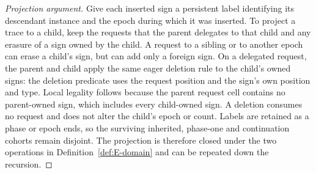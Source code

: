 \documentclass[11pt,letterpaper]{article}
\theoremstyle{definition}
\theoremstyle{remark}
\begin{document}
\begin{proof}[Projection argument]
Give each inserted sign a persistent label identifying its descendant instance and the epoch during which it was inserted. To project a trace to a child, keep the requests that the parent delegates to that child and any erasure of a sign owned by the child. A request to a sibling or to another epoch can erase a child's sign, but can add only a foreign sign. On a delegated request, the parent and child apply the same eager deletion rule to the child's owned signs: the deletion predicate uses the request position and the sign's own position and type. Local legality follows because the parent request cell contains no parent-owned sign, which includes every child-owned sign. A deletion consumes no request and does not alter the child's epoch or count. Labels are retained as a phase or epoch ends, so the surviving inherited, phase-one and continuation cohorts remain disjoint. The projection is therefore closed under the two operations in Definition~\ref{def:E-domain} and can be repeated down the recursion.
\end{proof}
\end{document}
